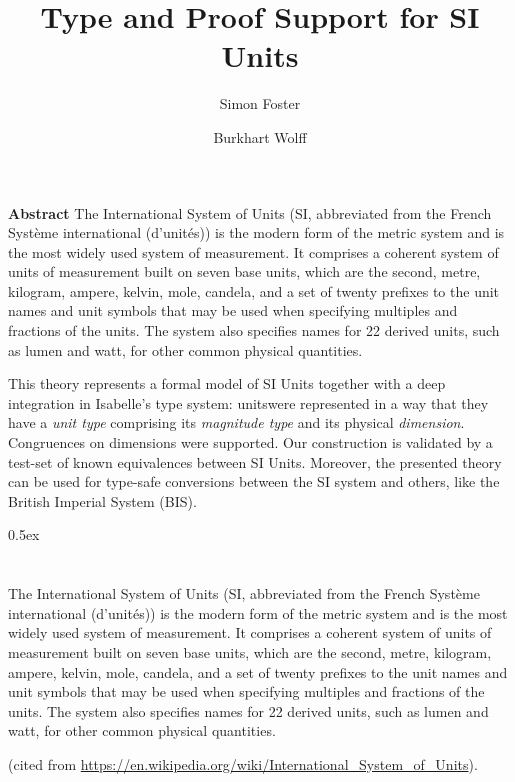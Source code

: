 \documentclass[11pt,a4paper]{book}
\begin{document}
\title{Type and Proof Support for SI Units}
\author{ Simon Foster \and Burkhart Wolff}
\maketitle

\textbf{ Abstract } 
The International System of Units 
(SI, abbreviated from the French Syst\`eme international (d’unit\'es)) is the modern form of 
the metric system and is the most widely used system of measurement. It comprises a coherent 
system of units of measurement built on seven base units, which are the second, metre, kilogram, 
ampere, kelvin, mole, candela, and a set of twenty prefixes to the unit names and unit symbols 
that may be used when specifying multiples and fractions of the units. The system also specifies 
names for 22 derived units, such as lumen and watt, for other common physical quantities. 

This theory represents a formal model of SI Units together with a deep integration in Isabelle's
type system: unitswere represented in a way that they have a \emph{unit type} comprising its 
\emph{magnitude type} and its physical \emph{dimension}. Congruences on dimensions were supported. 
Our construction is validated by a test-set of known equivalences between SI Units.
Moreover, the presented theory can be used for type-safe conversions between the SI system and
others, like the British Imperial System (BIS).

\tableofcontents

\parindent 0pt\parskip 0.5ex


\chapter{}

The International System of Units (SI, abbreviated from the French
Système international (d'unités)) is the modern form of the metric
system and is the most widely used system of measurement. It comprises
a coherent system of units of measurement built on seven base units,
which are the second, metre, kilogram, ampere, kelvin, mole, candela,
and a set of twenty prefixes to the unit names and unit symbols that
may be used when specifying multiples and fractions of the units.
The system also specifies names for 22 derived units, such as lumen and
watt, for other common physical quantities.

(cited from \url{https://en.wikipedia.org/wiki/International_System_of_Units}).
\end{document}
